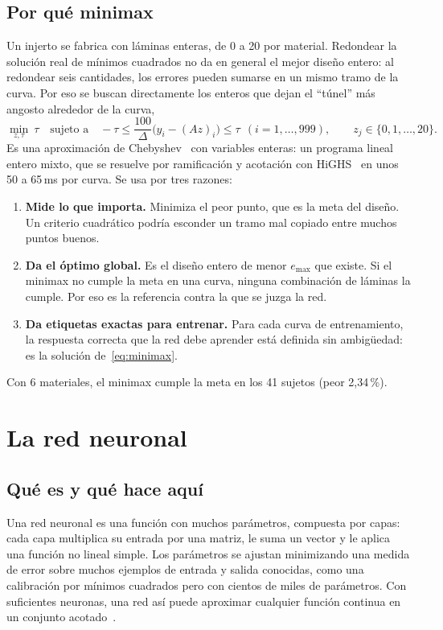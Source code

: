 \subsection{Por qué minimax}
Un injerto se fabrica con láminas enteras, de 0 a 20 por material. Redondear la solución real de mínimos cuadrados no da en general el mejor diseño entero: al redondear seis cantidades, los errores pueden sumarse en un mismo tramo de la curva. Por eso se buscan directamente los enteros que dejan el ``túnel'' más angosto alrededor de la curva,
\begin{equation}\label{eq:minimax}
\min_{z,\tau}\ \tau\quad\text{sujeto a}\quad -\tau\le\frac{100}{\Delta}\bigl(y_i-(Az)_i\bigr)\le\tau\ \ (i=1,\ldots,999),\qquad z_j\in\{0,1,\ldots,20\}.
\end{equation}
Es una aproximación de Chebyshev~\cite{cheney} con variables enteras: un programa lineal entero mixto, que se resuelve por ramificación y acotación con HiGHS~\cite{highs} en unos 50 a 65\,ms por curva. Se usa por tres razones:
\begin{enumerate}[label=(\roman*)]
\item \textbf{Mide lo que importa.} Minimiza el peor punto, que es la meta del diseño. Un criterio cuadrático podría esconder un tramo mal copiado entre muchos puntos buenos.
\item \textbf{Da el óptimo global.} Es el diseño entero de menor $e_{\max}$ que existe. Si el minimax no cumple la meta en una curva, ninguna combinación de láminas la cumple. Por eso es la referencia contra la que se juzga la red.
\item \textbf{Da etiquetas exactas para entrenar.} Para cada curva de entrenamiento, la respuesta correcta que la red debe aprender está definida sin ambigüedad: es la solución de~\eqref{eq:minimax}.
\end{enumerate}
Con 6 materiales, el minimax cumple la meta en los 41 sujetos (peor 2,34\,\%).

\section{La red neuronal}
\subsection{Qué es y qué hace aquí}
Una red neuronal es una función con muchos parámetros, compuesta por capas: cada capa multiplica su entrada por una matriz, le suma un vector y le aplica una función no lineal simple. Los parámetros se ajustan minimizando una medida de error sobre muchos ejemplos de entrada y salida conocidas, como una calibración por mínimos cuadrados pero con cientos de miles de parámetros. Con suficientes neuronas, una red así puede aproximar cualquier función continua en un conjunto acotado~\cite{cybenko,hornik}.

